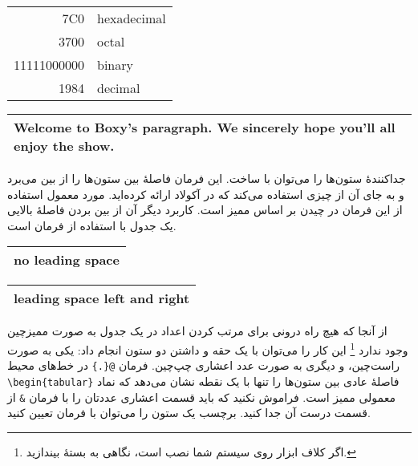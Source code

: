 \begin{example}
\begin{tabular}{|r|l|}
\hline
7C0 & hexadecimal \\
3700 & octal \\ \cline{2-2}
11111000000 & binary \\
\hline \hline
1984 & decimal \\
\hline
\end{tabular}
\end{example}

\begin{example}
\begin{tabular}{|p{4.7cm}|}
\hline
Welcome to Boxy's paragraph.
We sincerely hope you'll 
all enjoy the show.\\
\hline 
\end{tabular}
\end{example}

جداکنندهٔ ستون‌ها را می‌توان با 
ساخت. این فرمان فاصلهٔ بین ستون‌ها را از بین می‌برد و به جای آن از چیزی استفاده می‌کند که در آکولاد ارائه کرده‌اید. مورد معمول استفاده از این فرمان در چیدن بر اساس ممیز است. کاربرد دیگر آن از بین بردن فاصلهٔ بالایی یک جدول با استفاده از فرمان 
است.

\begin{example}
\begin{tabular}{@{} l @{}}
\hline 
no leading space\\
\hline
\end{tabular}
\end{example}

\begin{example}
\begin{tabular}{l}
\hline
leading space left and right\\
\hline
\end{tabular}
\end{example}

%
%

از آنجا که هیچ راه درونی برای مرتب کردن اعداد در یک جدول به صورت ممیزچین وجود ندارد
\footnote{اگر کلاف ابزار روی سیستم شما نصب است، نگاهی به بستهٔ
 بیندازید.}
این کار را می‌توان با یک حقه و داشتن دو ستون انجام داد: یکی به صورت راست‌چین، و دیگری به صورت عدد اعشاری  چپ‌چین. فرمان 
\verb|@{.}|
در  خط‌های محیط 
\verb|\begin{tabular}|
فاصلهٔ عادی بین ستون‌ها را تنها با یک نقطه نشان می‌دهد که نماد معمولی ممیز است. فراموش نکنید که باید قسمت اعشاری عددتان را با فرمان 
\verb|&|
از قسمت درست آن جدا کنید. برچسب یک ستون را می‌توان با فرمان 
تعیین کنید.
 
